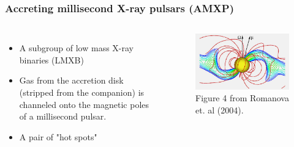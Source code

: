 \documentclass{beamer}
\begin{document}
\begin{frame}
\frametitle{Accreting millisecond X-ray pulsars (AMXP)}
\begin{columns}[c] %

\begin{itemize}
\item A subgroup of low mass X-ray binaries (LMXB)
\item Gas from the accretion disk (stripped from the companion) is channeled onto the magnetic poles of a millisecond pulsar.
\item A pair of "hot spots"
\end{itemize}


\begin{figure}
\includegraphics[width=1.1\linewidth]{schematic.jpg}
\caption{Figure 4 from Romanova et. al (2004).}
\end{figure}

\end{columns}
\end{frame}
\end{document}
